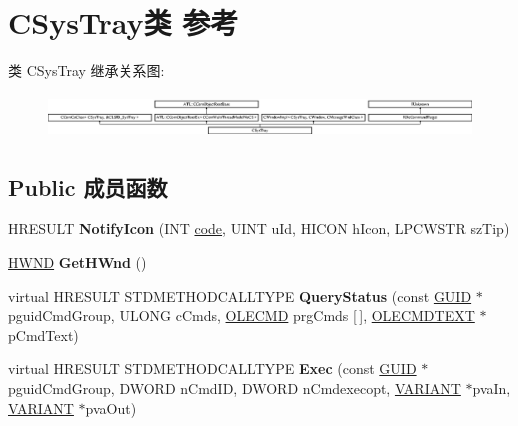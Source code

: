 \hypertarget{class_c_sys_tray}{}\section{C\+Sys\+Tray类 参考}
\label{class_c_sys_tray}
类 C\+Sys\+Tray 继承关系图\+:\begin{figure}[H]
\begin{center}
\leavevmode
\includegraphics[height=1.160221cm]{class_c_sys_tray}
\end{center}
\end{figure}
\subsection*{Public 成员函数}
\begin{DoxyCompactItemize}
\item 
\mbox{\label{class_c_sys_tray_a4adb38f131043e38391b8b611d841a25}} 
H\+R\+E\+S\+U\+LT {\bfseries Notify\+Icon} (I\+NT \hyperlink{structcode}{code}, U\+I\+NT u\+Id, H\+I\+C\+ON h\+Icon, L\+P\+C\+W\+S\+TR sz\+Tip)
\item 
\mbox{\label{class_c_sys_tray_a5d663cb3e8ede048aa35cf3702636b03}} 
\hyperlink{interfacevoid}{H\+W\+ND} {\bfseries Get\+H\+Wnd} ()
\item 
\mbox{\label{class_c_sys_tray_ac1fd1a9099a6b8a0498f31c7ec8548ed}} 
virtual H\+R\+E\+S\+U\+LT S\+T\+D\+M\+E\+T\+H\+O\+D\+C\+A\+L\+L\+T\+Y\+PE {\bfseries Query\+Status} (const \hyperlink{interface_g_u_i_d}{G\+U\+ID} $\ast$pguid\+Cmd\+Group, U\+L\+O\+NG c\+Cmds, \hyperlink{struct_i_ole_command_target_1_1__tag_o_l_e_c_m_d}{O\+L\+E\+C\+MD} prg\+Cmds \mbox{[}$\,$\mbox{]}, \hyperlink{struct_i_ole_command_target_1_1__tag_o_l_e_c_m_d_t_e_x_t}{O\+L\+E\+C\+M\+D\+T\+E\+XT} $\ast$p\+Cmd\+Text)
\item 
\mbox{\label{class_c_sys_tray_a466c6eb280cbc1a6aaf39408778f93b4}} 
virtual H\+R\+E\+S\+U\+LT S\+T\+D\+M\+E\+T\+H\+O\+D\+C\+A\+L\+L\+T\+Y\+PE {\bfseries Exec} (const \hyperlink{interface_g_u_i_d}{G\+U\+ID} $\ast$pguid\+Cmd\+Group, D\+W\+O\+RD n\+Cmd\+ID, D\+W\+O\+RD n\+Cmdexecopt, \hyperlink{structtag_v_a_r_i_a_n_t}{V\+A\+R\+I\+A\+NT} $\ast$pva\+In, \hyperlink{structtag_v_a_r_i_a_n_t}{V\+A\+R\+I\+A\+NT} $\ast$pva\+Out)
\end{DoxyCompactItemize}
